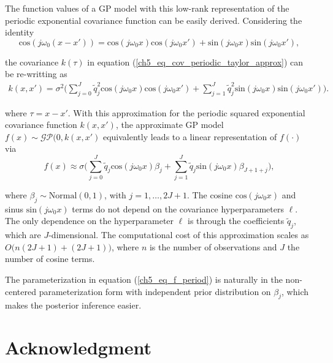 \documentclass[onecolumn,a4paper,11pt]{article}
\begin{document}
The function values of a GP model with this low-rank representation of the periodic exponential covariance function can be easily derived. Considering the identity
\begin{equation*}
\text{cos}(j\omega_0 (x-x'))=\text{cos}(j\omega_0 x) \text{cos}(j\omega_0 x') + \text{sin}(j\omega_0 x) \text{sin}(j\omega_0 x'),
\end{equation*}

\noindent the covariance $k(\tau)$ in equation (\ref{ch5_eq_cov_periodic_taylor_approx}) can be re-writting as
%
\begin{eqnarray} \label{ch5_eq_cov_periodic_taylor_approx_2}
k(x,x')= \sigma^2 \Big( \sum_{j=0}^{J} \tilde{q}_j^2 \text{cos}(j\omega_0 x)  \text{cos}(j\omega_0 x') + \sum_{j=1}^{J} \tilde{q}_j^2 \text{sin}(j\omega_0 x) \text{sin}(j\omega_0 x') \Big).
\end{eqnarray}

\noindent where $\tau=x-x'$. With this approximation for the periodic squared exponential covariance function $k(x,x')$, the approximate GP model $f(x) \sim \mathcal{GP}(0,k(x,x')$ equivalently leads to a linear representation of $f(\cdot)$ via
%
\begin{equation} \label{ch5_eq_f_period}
f(x) \approx \sigma \Big( \sum_{j=0}^J  \tilde{q}_j \text{cos}(j\omega_0 x) \beta_j +  \sum_{j=1}^J \tilde{q}_j \text{sin}(j\omega_0 x) \beta_{J+1+j} \Big),
\end{equation}

\noindent where $\beta_j \sim \text{Normal}(0,1)$, with $j=1,\dots,2J+1$. The cosine $\text{cos}(j\omega_0 x)$ and sinus $\text{sin}(j\omega_0 x)$ terms do not depend on the covariance hyperparameters $\ell$. The only dependence on the hyperparameter $\ell$ is through the coefficients $\tilde{q}_j$, which are $J$-dimensional. The computational cost of this approximation scales as $O\big(n(2J+1) + (2J+1)\big)$, where $n$ is the number of observations and $J$ the number of cosine terms.

The parameterization in equation (\ref{ch5_eq_f_period}) is naturally in the non-centered
parameterization form with independent prior distribution on
$\beta_j$, which makes the posterior inference easier.



\section*{Acknowledgment}



\end{document}
